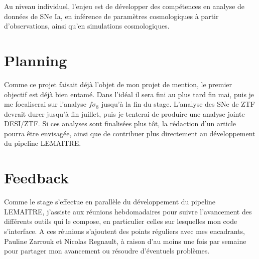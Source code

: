 \documentclass{article}
\begin{document}
Au niveau individuel, l'enjeu est de développer des compétences en analyse de données de SNe Ia, en inférence de paramètres cosmologiques à partir d'observations, ainsi qu'en simulations cosmologiques.

\section{Planning}


Comme ce projet faisait déjà l'objet de mon projet de mention, le premier objectif est déjà bien entamé. Dans l'idéal il sera fini au plus tard fin mai, puis je me focaliserai sur l'analyse $f\sigma_8$ jusqu'à la fin du stage. L'analyse des SNe de ZTF devrait durer jusqu'à fin juillet, puis je tenterai de produire une analyse jointe DESI/ZTF. Si ces analyses sont finalisées plus tôt, la rédaction d'un article pourra être envisagée, ainsi que de contribuer plus directement au développement du pipeline LEMAITRE.

\section{Feedback}


Comme le stage s'effectue en parallèle du développement du pipeline LEMAITRE, j'assiste aux réunions hebdomadaires pour suivre l'avancement des différents outils qui le compose, en particulier celles sur lesquelles mon code s'interface. A ces réunions s'ajoutent des points réguliers avec mes encadrants, Pauline Zarrouk et Nicolas Regnault, à raison d'au moins une fois par semaine pour partager mon avancement ou résoudre d'éventuels problèmes.


\printbibliography
\end{document}
